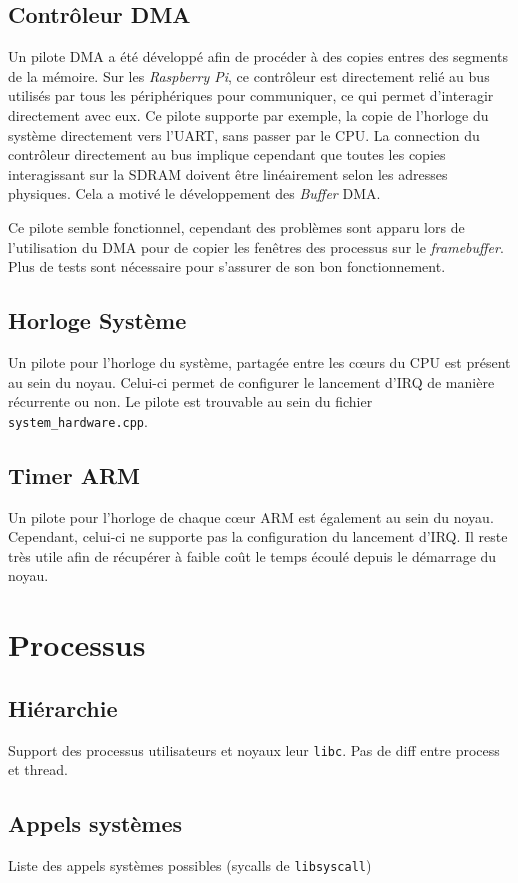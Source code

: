 \documentclass[french, 12pt]{article}
\newcommand{\rpi}{\emph{Raspberry Pi}}
\begin{document}
\subsection{Contrôleur DMA}
Un pilote DMA a été développé afin de procéder à des copies entres des segments
de la mémoire. Sur les \rpi{}, ce contrôleur est directement relié au bus
utilisés par tous les périphériques pour communiquer, ce qui permet d'interagir
directement avec eux. Ce pilote supporte par exemple, la copie de l'horloge du
système directement vers l'UART, sans passer par le CPU. La connection du
contrôleur directement au bus implique cependant que toutes les copies
interagissant sur la SDRAM doivent être linéairement selon les adresses
physiques. Cela a motivé le développement des \textit{Buffer} DMA.

Ce pilote semble fonctionnel, cependant des problèmes sont apparu lors de
l'utilisation du DMA pour de copier les fenêtres des processus sur le
\textit{framebuffer}. Plus de tests sont nécessaire pour s'assurer de son bon
fonctionnement.

\subsection{Horloge Système}
Un pilote pour l'horloge du système, partagée entre les cœurs du CPU est présent
au sein du noyau. Celui-ci permet de configurer le lancement d'IRQ de manière
récurrente ou non. Le pilote est trouvable au sein du fichier
\texttt{system\_hardware.cpp}.

\subsection{Timer ARM}
Un pilote pour l'horloge de chaque cœur ARM est également au sein du noyau.
Cependant, celui-ci ne supporte pas la configuration du lancement d'IRQ. Il
reste très utile afin de récupérer à faible coût le temps écoulé depuis le
démarrage du noyau.

\section{Processus}
\subsection{Hiérarchie}
Support des processus utilisateurs et noyaux leur \texttt{libc}.
Pas de diff entre process et thread.

\subsection{Appels systèmes}
Liste des appels systèmes possibles (sycalls de \texttt{libsyscall})
\end{document}

